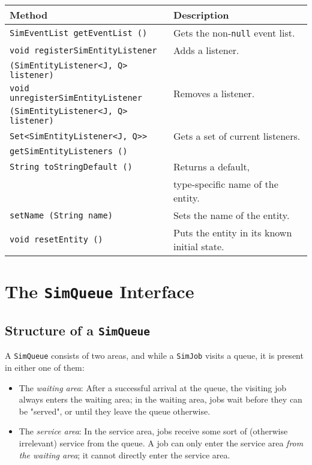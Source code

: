 \documentclass[12pt]{book}
\begin{document}
\begin{tabular}{|l|l|}
  \hline
  {\bf Method} & {\bf Description} \\
  \hline
  \lstinline[basicstyle=\footnotesize]!SimEventList getEventList ()!
    & Gets the non-\lstinline|null| event list.
    \\ \hline
  \lstinline[basicstyle=\footnotesize]!void registerSimEntityListener!
    & Adds a listener.
    \\
  \lstinline[basicstyle=\footnotesize]!(SimEntityListener<J, Q> listener)!
    & \\ \hline
  \lstinline[basicstyle=\footnotesize]!void unregisterSimEntityListener!
    & Removes a listener.
    \\
  \lstinline[basicstyle=\footnotesize]!(SimEntityListener<J, Q> listener)!
    & \\ \hline
  \lstinline[basicstyle=\footnotesize]!Set<SimEntityListener<J, Q>>!
    & Gets a set of current listeners.
    \\
  \lstinline[basicstyle=\footnotesize]!getSimEntityListeners ()!
    & \\ \hline
  \lstinline[basicstyle=\footnotesize]!String toStringDefault ()!
    & Returns a default, \\
    & type-specific name of the entity. \\ \hline
  \lstinline[basicstyle=\footnotesize]!setName (String name)!
    & Sets the name of the entity. \\ \hline
  \lstinline[basicstyle=\footnotesize]!void resetEntity ()!
    & Puts the entity in its known initial state. \\
  \hline
\end{tabular}

\section{The \lstinline|SimQueue| Interface}

\subsection{Structure of a \lstinline|SimQueue|}

A \lstinline|SimQueue| consists of two areas,
  and while a \lstinline|SimJob| visits a queue,
  it is present in either one of them:
\begin{itemize}
\item The {\em waiting area\/}: After a successful arrival at the queue,
        the visiting job always enters the waiting area;
        in the waiting area, jobs wait before they can be "served",
        or until they leave the queue otherwise.
\item The {\em service area\/}: In the service area,
        jobs receive some sort of (otherwise irrelevant) service from the queue.
      A job can only enter the service area {\em from the waiting area\/};
        it cannot directly enter the service area.
\end{itemize}
\end{document}
